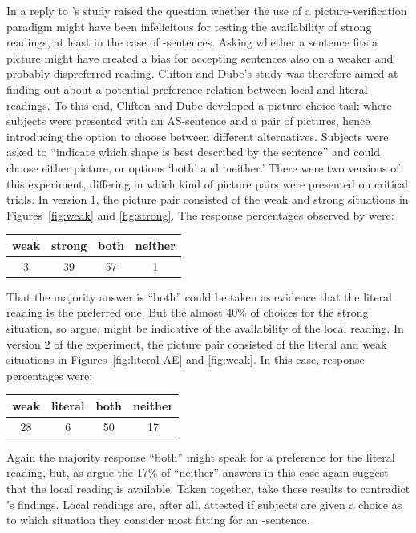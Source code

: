 \documentclass[fleqn,reqno,10pt,draft]{article}
\newcommand{\as}{\acro{as}}
\begin{document}
In a reply to \citeauthor{GeurtsPouscoulous2009:Embedded-Implic}'s
study \citeauthor{CliftonDube2010:Embedded-Implic} raised the question
whether the use of a picture-verification paradigm might have been
infelicitous for testing the availability of strong readings, at least
in the case of \as-sentences. Asking whether a sentence fits a picture
might have created a bias for accepting sentences also on a weaker and
probably dispreferred reading. Clifton and Dube's study was therefore
aimed at finding out about a potential preference relation between
local and literal readings. To this end, Clifton and Dube developed a
picture-choice task where subjects were presented with an AS-sentence
and a pair of pictures, hence introducing the option to choose between
different alternatives. Subjects were asked to ``indicate which shape
is best described by the sentence'' and could choose either picture,
or options `both' and `neither.' There were two versions of this
experiment, differing in which kind of picture pairs were presented on
critical trials. In version 1, the picture pair consisted of the weak
and strong situations in Figures~\ref{fig:weak} and
\ref{fig:strong}. The response percentages observed by
\citeauthor{CliftonDube2010:Embedded-Implic} were:

\begin{center}
  \begin{tabular}{cccc}
    weak & strong & both & neither
    \\ \midrule 
 3 & 39 & 57 & 1 
  \end{tabular}
\end{center}

\noindent That the majority answer is ``both'' could be taken as
evidence that the literal reading is the preferred one. But the almost
40\% of choices for the strong situation, so
\citeauthor{CliftonDube2010:Embedded-Implic} argue, might be
indicative of the availability of the local reading. In version 2 of
the experiment, the picture pair consisted of the literal and weak
situations in Figures~\ref{fig:literal-AE} and \ref{fig:weak}. In this
case, response percentages were:

\begin{center}
  \begin{tabular}{cccc}
    weak & literal & both & neither
    \\ \midrule 
    28 & 6 & 50 & 17 
  \end{tabular}
\end{center}

\noindent Again the majority response ``both'' might speak for a
preference for the literal reading, but, as
\citeauthor{CliftonDube2010:Embedded-Implic} argue the 17\% of
``neither'' answers in this case again suggest that the local reading
is available. Taken together,
\citeauthor{CliftonDube2010:Embedded-Implic} take these results to
contradict \citeauthor{GeurtsPouscoulous2009:Embedded-Implic}'s
findings. Local readings are, after all, attested if subjects are
given a choice as to which situation they consider most fitting for an
\as-sentence.
\end{document}
